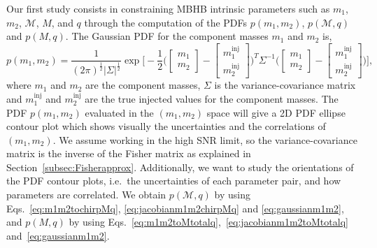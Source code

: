 \documentclass[a4paper,12pt]{article}
\begin{document}
Our first study consists in constraining MBHB intrinsic parameters such as $m_1$, $m_2$, $\mathcal{M}$, $M$, and $q$ through the computation of the PDFs $p(m_1,m_2)$, $p(\mathcal{M},q)$ and $p(M,q)$. The Gaussian PDF for the component masses $m_1$ and $m_2$ is,
\begin{equation}
p(m_1,m_2)= \frac{1}{{(2\pi)}^{\frac{1}{2}}\big|\Sigma\big|^{\frac{1}{2}}} \exp \Big[-\frac{1}{2}\bigg( 
\begin{bmatrix}     
     m_1 \\
     m_2 
\end{bmatrix}
-
\begin{bmatrix}
     m^\mathrm{inj}_{1} \\
     m^\mathrm{inj}_{2} 
\end{bmatrix}
\bigg)^{T} \Sigma^{-1} 
\bigg( 
\begin{bmatrix}     
     m_1 \\
     m_2 
\end{bmatrix}
-
\begin{bmatrix}
     m^\mathrm{inj}_{1} \\
     m^\mathrm{inj}_{2} 
\end{bmatrix}
\bigg)
\Big],
\label{eq:gaussianm1m2}
\end{equation}
where $m_1$ and $m_2$ are the component masses, $\Sigma$ is the variance-covariance matrix and $m^\mathrm{inj}_1$ and $m^\mathrm{inj}_{2}$ are the true injected values for the component masses. The PDF $p(m_1,m_2)$ evaluated in the $(m_1,m_2)$ space will give a 2D PDF ellipse contour plot which shows visually the uncertainties and the correlations of $(m_1,m_2)$. We assume working in the high SNR limit, so the variance-covariance matrix is the inverse of the Fisher matrix as explained in Section~\ref{subsec:Fisherapprox}. Additionally, we want to study the orientations of the PDF contour plots, i.e.\ the uncertainties of each parameter pair, and how parameters are correlated.  We obtain $p(\mathcal{M},q)$ by using Eqs.~\eqref{eq:m1m2tochirpMq}, \eqref{eq:jacobianm1m2chirpMq} and \eqref{eq:gaussianm1m2}, and $p(M,q)$ by using Eqs.~\eqref{eq:m1m2toMtotalq},~\eqref{eq:jacobianm1m2toMtotalq} and~\eqref{eq:gaussianm1m2}.
\end{document}
